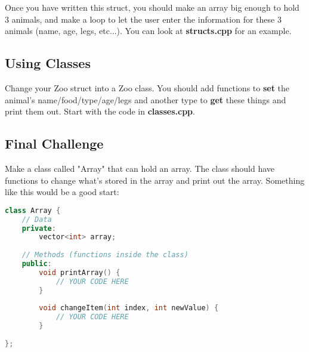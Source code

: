 \documentclass[a4paper,12pt]{article} %
\begin{document}
\noindent
Once you have written this struct, you should make an array big enough to hold 3 animals, and make a loop to let the user enter the information for these 3 animals (name, age, legs, etc...). You can look at \textbf{structs.cpp} for an example.

\subsection{Using Classes}

Change your Zoo struct into a Zoo class. You should add functions to \textbf{set} the animal's name/food/type/age/legs and another type to \textbf{get} these things and print them out. Start with the code in \textbf{classes.cpp}.

\subsection{Final Challenge}

Make a class called "Array" that can hold an array. The class should have functions to change what's stored in the array and print out the array. Something like this would be a good start:

\vspace{5mm}
\begin{lstlisting}[language=C++]
class Array {
	// Data
	private:
		vector<int> array; 
	    
	// Methods (functions inside the class)
	public:
		void printArray() {
			// YOUR CODE HERE
		}
		
		void changeItem(int index, int newValue) {
			// YOUR CODE HERE
		}
	
};
\end{lstlisting}
\end{document}
